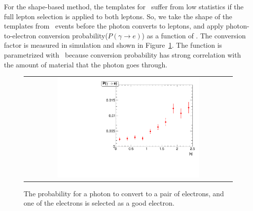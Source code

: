 For the shape-based method, the templates for \wgamma\ suffer from low statistics 
if the full lepton selection is applied to both leptons. So, we take the shape of the 
templates from \wgamma\ events before the photon converts to leptons, and apply 
photon-to-electron conversion probability($P(\gamma \rightarrow e)$) as a function of \Eta. 
The conversion 
factor is measured in simulation and shown in Figure~\ref{fig:photon_electron_ratio}.  
The function is parametrized with \Eta\ because conversion probability has strong 
correlation with the amount of material that the photon goes through.
\begin{figure}[htp] 
\centering 
\begin{tabular}{c} 
\includegraphics[width=0.7\textwidth]{figures/ratio_photon_electron.pdf} 
\end{tabular} 
\caption{The probability for a photon to convert to a pair of electrons, 
and one of the electrons is selected as a good electron.  } 
\label{fig:photon_electron_ratio} 
\end{figure}  

